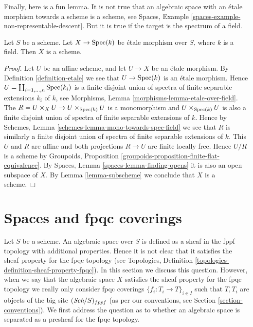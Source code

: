 \noindent
Finally, here is a fun lemma. It is not true that an algebraic space
with an \'etale morphism towards a scheme is a scheme, see
Spaces, Example \ref{spaces-example-non-representable-descent}.
But it is true if the target is the spectrum of a field.

\begin{lemma}
\label{lemma-etale-over-field-scheme}
Let $S$ be a scheme. Let $X \to \mathop{\rm Spec}(k)$
be \'etale morphism over $S$, where $k$ is a field.
Then $X$ is a scheme.
\end{lemma}

\begin{proof}
Let $U$ be an affine scheme, and let $U \to X$ be an \'etale morphism. By
Definition \ref{definition-etale}
we see that $U \to \mathop{\rm Spec}(k)$ is an \'etale
morphism. Hence $U = \coprod_{i = 1, \ldots, n} \mathop{\rm Spec}(k_i)$
is a finite disjoint union of spectra of finite separable extensions
$k_i$ of $k$, see
Morphisms, Lemma \ref{morphisms-lemma-etale-over-field}.
The $R = U \times_X U \to U \times_{\mathop{\rm Spec}(k)} U$ is a monomorphism
and $U \times_{\mathop{\rm Spec}(k)} U$ is also a finite disjoint union of
spectra of finite separable extensions of $k$. Hence by
Schemes, Lemma \ref{schemes-lemma-mono-towards-spec-field}
we see that $R$ is similarly a finite disjoint union of
spectra of finite separable extensions of $k$.
This $U$ and $R$ are affine and
both projections $R \to U$ are finite locally free.
Hence $U/R$ is a scheme by
Groupoids, Proposition \ref{groupoids-proposition-finite-flat-equivalence}.
By
Spaces, Lemma \ref{spaces-lemma-finding-opens}
it is also an open subspace of $X$. By
Lemma \ref{lemma-subscheme}
we conclude that $X$ is a scheme.
\end{proof}













\section{Spaces and fpqc coverings}
\label{section-fpqc}

\noindent
Let $S$ be a scheme.
An algebraic space over $S$ is defined as a sheaf in the fppf topology with
additional properties. Hence it is not clear that it satisfies the sheaf
property for the fpqc topology (see
Topologies, Definition \ref{topologies-definition-sheaf-property-fpqc}).
In this section we discuss this question. However, when we say that
the algebraic space $X$ satisfies the sheaf property for the fpqc topology
we really only consider fpqc coverings $\{f_i : T_i \to T\}_{i \in I}$ such
that $T, T_i$ are objects of the big site $(\textit{Sch}/S)_{fppf}$ (as per
our conventions, see Section \ref{section-conventions}). We first address the
question as to whether an algebraic space is separated as a presheaf for the
fpqc topology.

